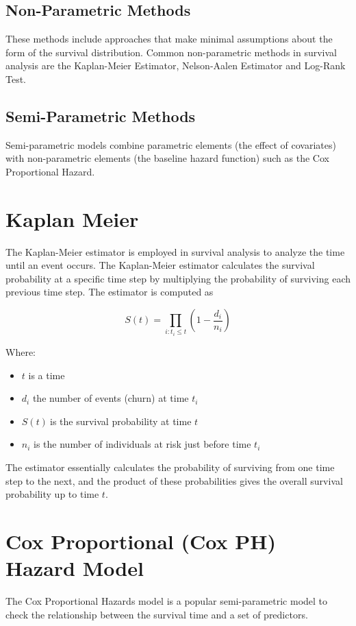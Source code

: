 \documentclass[doublespacing]{report} %
\begin{document}
\subsection{Non-Parametric Methods}

These methods include approaches that make minimal assumptions about the form of the survival distribution. Common non-parametric methods in survival analysis are the Kaplan-Meier Estimator, Nelson-Aalen Estimator and Log-Rank Test.

\subsection{Semi-Parametric Methods}

Semi-parametric models combine parametric elements (the effect of covariates) with non-parametric elements (the baseline hazard function) such as the Cox Proportional Hazard.

\section{Kaplan Meier}
The Kaplan-Meier estimator is employed in survival analysis to analyze the time until an event occurs. The Kaplan-Meier estimator calculates the survival probability at a specific time step by multiplying the probability of surviving each previous time step.
The estimator is computed as

\[S\left(t\right)=\prod_{i:t_i\le t}\left(1-\frac{d_i}{n_i}\right)\]

Where:
 \begin{itemize}
     \item \(t\) is a time
     \item \(d_i \) the number of events (churn) at time \(t_i\)
     \item \(S\left(t\right)\ \)is the survival probability at time \(t\)
     \item \(n_i\) is the number of individuals at risk just before time \(t_i\)
 \end{itemize}
The estimator essentially calculates the probability of surviving from one time step to the next, and the product of these probabilities gives the overall survival probability up to time \(t\).

\section{Cox Proportional (Cox PH) Hazard Model}

The Cox Proportional Hazards model is a popular semi-parametric model to check the relationship between the survival time and a set of predictors.
\end{document}
